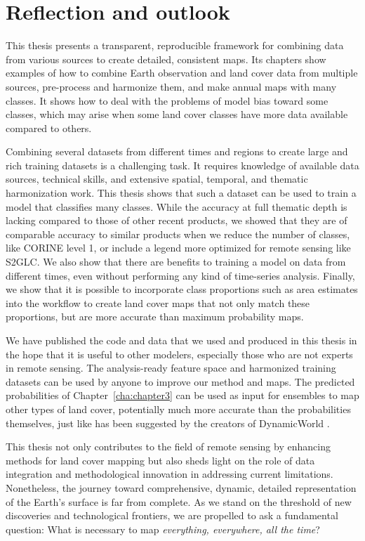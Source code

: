 \section{Reflection and outlook}

    This thesis presents a transparent, reproducible framework for combining data from various sources to create detailed, consistent maps. Its chapters show examples of how to combine Earth observation and land cover data from multiple sources, pre-process and harmonize them, and make annual maps with many classes. It shows how to deal with the problems of model bias toward some classes, which may arise when some land cover classes have more data available compared to others.
    
    Combining several datasets from different times and regions to create large and rich training datasets is a challenging task. It requires knowledge of available data sources, technical skills, and extensive spatial, temporal, and thematic harmonization work. This thesis shows that such a dataset can be used to train a model that classifies many classes. While the accuracy at full thematic depth is lacking compared to those of other recent products, we showed that they are of comparable accuracy to similar products when we reduce the number of classes, like CORINE level 1, or include a legend more optimized for remote sensing like S2GLC. We also show that there are benefits to training a model on data from different times, even without performing any kind of time-series analysis. Finally, we show that it is possible to incorporate class proportions such as area estimates into the workflow to create land cover maps that not only match these proportions, but are more accurate than maximum probability maps.

    We have published the code and data that we used and produced in this thesis in the hope that it is useful to other modelers, especially those who are not experts in remote sensing. The analysis-ready feature space and harmonized training datasets can be used by anyone to improve our method and maps. The predicted probabilities of Chapter\@~\ref{cha:chapter3} can be used as input for ensembles to map other types of land cover, potentially much more accurate than the probabilities themselves, just like has been suggested by the creators of DynamicWorld \citep{brown2022dynamic}.

    This thesis not only contributes to the field of remote sensing by enhancing methods for land cover mapping but also sheds light on the role of data integration and methodological innovation in addressing current limitations. Nonetheless, the journey toward comprehensive, dynamic, detailed representation of the Earth's surface is far from complete. As we stand on the threshold of new discoveries and technological frontiers, we are propelled to ask a fundamental question: What is necessary to map \textit{everything, everywhere, all the time}?


